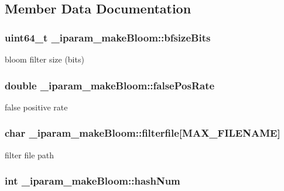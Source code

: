 \subsection{Member Data Documentation}
\hypertarget{struct__iparam__makeBloom_a8a0dac58ee8e9f1d8b29be730a5205a8}{
\subsubsection[{bfsize\+Bits}]{\setlength{\rightskip}{0pt plus 5cm}uint64\+\_\+t \+\_\+iparam\+\_\+make\+Bloom\+::bfsize\+Bits}}\label{struct__iparam__makeBloom_a8a0dac58ee8e9f1d8b29be730a5205a8}
bloom filter size (bits) \hypertarget{struct__iparam__makeBloom_a45fea7e1c00758d18e42f92c3ec9e29e}{
\subsubsection[{false\+Pos\+Rate}]{\setlength{\rightskip}{0pt plus 5cm}double \+\_\+iparam\+\_\+make\+Bloom\+::false\+Pos\+Rate}}\label{struct__iparam__makeBloom_a45fea7e1c00758d18e42f92c3ec9e29e}
false positive rate \hypertarget{struct__iparam__makeBloom_aa3f7d0ba452807285408a70afbb5947b}{
\subsubsection[{filterfile}]{\setlength{\rightskip}{0pt plus 5cm}char \+\_\+iparam\+\_\+make\+Bloom\+::filterfile\mbox{[}{\bf M\+A\+X\+\_\+\+F\+I\+L\+E\+N\+A\+M\+E}\mbox{]}}}\label{struct__iparam__makeBloom_aa3f7d0ba452807285408a70afbb5947b}
filter file path \hypertarget{struct__iparam__makeBloom_a0e8c97b918d06b17856569ede06bb2d9}{
\subsubsection[{hash\+Num}]{\setlength{\rightskip}{0pt plus 5cm}int \+\_\+iparam\+\_\+make\+Bloom\+::hash\+Num}}\label{struct__iparam__makeBloom_a0e8c97b918d06b17856569ede06bb2d9}
